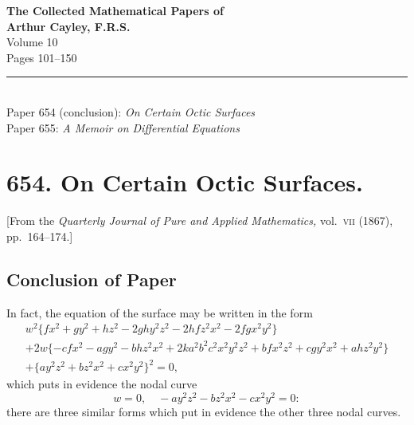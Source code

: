 \documentclass[11pt,a4paper]{book}
\begin{document}
\begin{center}
{\Large\bfseries The Collected Mathematical Papers of\\[0.3em] Arthur Cayley, F.R.S.}\\[1em]
{\large Volume 10}\\[2em]
{\large Pages 101--150}\\[1em]
\rule{0.6\textwidth}{0.4pt}\\[1em]
{\normalsize Paper 654 (conclusion): \textit{On Certain Octic Surfaces}}\\[0.3em]
{\normalsize Paper 655: \textit{A Memoir on Differential Equations}}\\[2em]
\end{center}

\thispagestyle{empty}
\newpage
\setcounter{page}{101}

\section*{654. On Certain Octic Surfaces.}

\begin{center}
[From the \textit{Quarterly Journal of Pure and Applied Mathematics,} vol.~\textsc{vii} (1867), pp.~164--174.]
\end{center}

\subsection*{Conclusion of Paper}

\setcounter{equation}{0}
\setcounter{page}{101}

In fact, the equation of the surface may be written in the form
%
\begin{multline}
w^{2} \{f x^{2} + g y^{2} + h z^{2} - 2gh y^{2} z^{2} - 2hf z^{2} x^{2} - 2fg x^{2} y^{2}\} \\
+ 2w \{-cf x^{2} - ag y^{2} - bh z^{2} x^{2} + 2k a^{2} b^{2} c^{2} x^{2} y^{2} z^{2}
+ bf x^{2} z^{2} + cg y^{2} x^{2} + ah z^{2} y^{2}\} \\
+ \{ay^{2} z^{2} + bz^{2} x^{2} + cx^{2} y^{2}\}^{2} = 0,
\end{multline}
%
which puts in evidence the nodal curve
\[
w = 0, \quad -ay^{2} z^{2} - bz^{2} x^{2} - cx^{2} y^{2} = 0:
\]
there are three similar forms which put in evidence the other three nodal curves.
\end{document}
